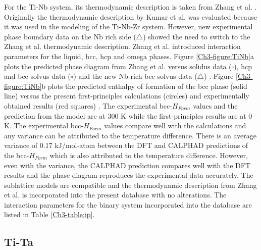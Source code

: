For the Ti-Nb system, its thermodynamic description is taken from Zhang et al. \cite{Zhang2001}. Originally the thermodynamic description by Kumar et al. \cite{Kumar1994,Kumar1994a} was evaluated because it was used in the modeling of the Ti-Nb-Zr system. However, new experimental phase boundary data on the Nb rich side ($\bigtriangleup$) showed the need to switch to the Zhang et al. \cite{Zhang2001} thermodynamic description. Zhang et al. \cite{Zhang2001} introduced interaction parameters for the liquid, bcc, hcp and omega phases. Figure \ref{Ch3-figure:TiNb}a plots the predicted phase diagram from Zhang et al. \cite{Zhang2001} versus solidus data ($\square$), hcp and bcc solvus data ($\circ$) \cite{Kumar1994,Kumar1994a} and the new Nb-rich bcc solvus data ($\bigtriangleup$) \cite{Zhang2001}. Figure \ref{Ch3-figure:TiNb}b plots the predicted enthalpy of formation of the bcc phase (solid line) versus the present first-principles calculations (circles) and experimentally obtained results (red squares) \cite{Uesugi2013}. The experimental bcc-$H_{Form}$ values and the prediction from the model are at 300 K while the first-principles results are at 0 K. The experimental bcc-$H_{Form}$ values compare well with the calculations and any variance can be attributed to the temperature difference. There is an average variance of 0.17 kJ/mol-atom between the DFT and CALPHAD predictions of the bcc-$H_{Form}$ which is also attributed to the temperature difference. However, even with the variance, the CALPHAD prediction compares well with the DFT results and the phase diagram reproduces the experimental data accurately. The sublattice models are compatible and the thermodynamic description from Zhang et al. \cite{Zhang2001} is incorporated into the present database with no alterations. The interaction parameters for the binary system incorporated into the database are listed in Table \ref{Ch3-table:ip}.

\subsection{Ti-Ta}

